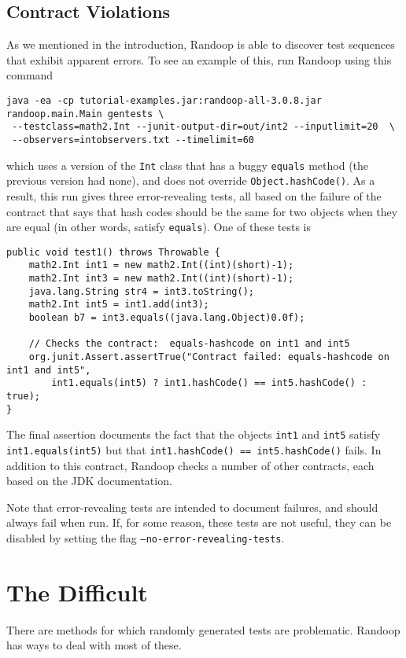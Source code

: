 \documentclass[11pt, oneside]{article} %
\newcommand{\code}[1]{{\texttt{#1}}}
\newcommand{\cmd}[1]{{\texttt{#1}}}
\begin{document}
\subsection{Contract Violations}
As we mentioned in the introduction, Randoop is able to discover test sequences that exhibit apparent errors. 
To see an example of this, run Randoop using this command
\begin{verbatim}
java -ea -cp tutorial-examples.jar:randoop-all-3.0.8.jar randoop.main.Main gentests \
 --testclass=math2.Int --junit-output-dir=out/int2 --inputlimit=20  \
 --observers=intobservers.txt --timelimit=60
\end{verbatim}
which uses a version of the \code{Int} class that has a buggy \code{equals} method (the previous version had none), and does not override \code{Object.hashCode()}.
As a result, this run gives three error-revealing tests, all based on the failure of the contract that says that hash codes should be the same for two objects when they are equal (in other words, satisfy \code{equals}).
One of these tests is
\begin{verbatim}
public void test1() throws Throwable {
    math2.Int int1 = new math2.Int((int)(short)-1);
    math2.Int int3 = new math2.Int((int)(short)-1);
    java.lang.String str4 = int3.toString();
    math2.Int int5 = int1.add(int3);
    boolean b7 = int3.equals((java.lang.Object)0.0f);
    
    // Checks the contract:  equals-hashcode on int1 and int5
    org.junit.Assert.assertTrue("Contract failed: equals-hashcode on int1 and int5", 
        int1.equals(int5) ? int1.hashCode() == int5.hashCode() : true);
} 
\end{verbatim}
The final assertion documents the fact that the objects \code{int1} and \code{int5} satisfy \code{int1.equals(int5)} but that \code{int1.hashCode() == int5.hashCode()} fails.
In addition to this contract, Randoop checks a number of other contracts, each based on the JDK documentation.

Note that error-revealing tests are intended to document failures, and should always fail when run. If, for some reason, these tests are not useful, they can be disabled by setting the flag \cmd{--no-error-revealing-tests}. 


\section{The Difficult}

There are methods for which randomly generated tests are problematic.
Randoop has ways to deal with most of these.
\end{document}
